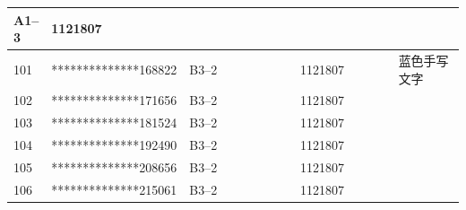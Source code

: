 \documentclass[UTF8,10pt,a4paper,fontset=fandol]{ctexart}
\newcommand{\fieldvalue}[1]{#1}
\newcommand{\handwritten}[1]{#1}
\begin{document}
\begin{center}
\begin{tabular}{|p{0.08\linewidth}|p{0.30\linewidth}|p{0.25\linewidth}|p{0.22\linewidth}|p{0.15\linewidth}|}
\fieldvalue{A1--3}
&
\fieldvalue{1121807}
& \\ \hline
\fieldvalue{101}
&
\fieldvalue{**************168822}
&
\fieldvalue{B3--2}
&
\fieldvalue{1121807}
&
\fieldvalue{\handwritten{蓝色手写文字}}
\\ \hline
\fieldvalue{102}
&
\fieldvalue{**************171656}
&
\fieldvalue{B3--2}
&
\fieldvalue{1121807}
& \\ \hline
\fieldvalue{103}
&
\fieldvalue{**************181524}
&
\fieldvalue{B3--2}
&
\fieldvalue{1121807}
& \\ \hline
\fieldvalue{104}
&
\fieldvalue{**************192490}
&
\fieldvalue{B3--2}
&
\fieldvalue{1121807}
& \\ \hline
\fieldvalue{105}
&
\fieldvalue{**************208656}
&
\fieldvalue{B3--2}
&
\fieldvalue{1121807}
& \\ \hline
\fieldvalue{106}
&
\fieldvalue{**************215061}
&
\fieldvalue{B3--2}
&
\fieldvalue{1121807}
& \\ \hline

\end{tabular}
\end{center}
\end{document}
